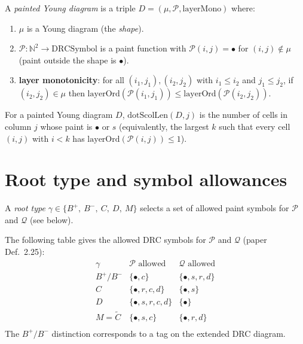 \begin{definition}
  \label{def:pyd}
  \leanok
  A \emph{painted Young diagram} is a triple $D = (\mu, \mathcal{P}, \mathrm{layerMono})$ where:
  \begin{enumerate}
    \item $\mu$ is a Young diagram (the \emph{shape}).
    \item $\mathcal{P} : \mathbb{N}^2 \to \mathrm{DRCSymbol}$ is a paint function with
      $\mathcal{P}(i, j) = \bullet$ for $(i, j) \notin \mu$ (paint outside the shape is $\bullet$).
    \item \textbf{layer monotonicity}: for all $(i_1, j_1), (i_2, j_2)$ with $i_1 \leq i_2$ and $j_1 \leq j_2$,
      if $(i_2, j_2) \in \mu$ then $\mathrm{layerOrd}(\mathcal{P}(i_1, j_1)) \leq \mathrm{layerOrd}(\mathcal{P}(i_2, j_2))$.
  \end{enumerate}
\end{definition}

\begin{definition}
  \label{def:dotScolLen}
  \leanok
  For a painted Young diagram $D$, $\mathrm{dotScolLen}(D, j)$ is the number of cells in column $j$ whose paint is $\bullet$ or $s$ (equivalently, the largest $k$ such that every cell $(i, j)$ with $i < k$ has $\mathrm{layerOrd}(\mathcal{P}(i, j)) \leq 1$).
\end{definition}

\section{Root type and symbol allowances}

\begin{definition}
  \label{def:RootType}
  \leanok
  A \emph{root type} $\gamma \in \{B^+,\ B^-,\ C,\ D,\ M\}$ selects a set of allowed paint symbols for $\mathcal{P}$ and $\mathcal{Q}$ (see below).
\end{definition}

\begin{definition}
  \label{def:sym_allowed}
  \leanok
  The following table gives the allowed DRC symbols for $\mathcal{P}$ and $\mathcal{Q}$ (paper Def.~2.25):
  \[
    \begin{array}{l|ll}
      \gamma & \mathcal{P}\text{ allowed} & \mathcal{Q}\text{ allowed} \\\hline
      B^+ / B^- & \{\bullet, c\} & \{\bullet, s, r, d\} \\
      C        & \{\bullet, r, c, d\} & \{\bullet, s\} \\
      D        & \{\bullet, s, r, c, d\} & \{\bullet\} \\
      M = \tilde{C}        & \{\bullet, s, c\} & \{\bullet, r, d\} \\
    \end{array}
  \]
  The $B^+/B^-$ distinction corresponds to a tag on the extended DRC diagram.
\end{definition}

